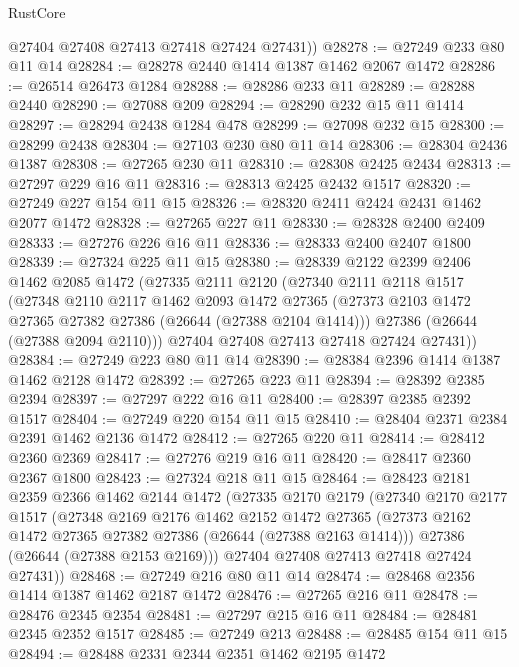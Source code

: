 \begin{lexlean}{RustCore}
\begin{coremodule}
        @27404
        @27408
        @27413
        @27418
        @27424
        @27431))
@28278 := @27249 @233 @80 @11 @14
@28284 := @28278 @2440 @1414 @1387 @1462 @2067 @1472
@28286 := @26514 @26473 @1284
@28288 := @28286 @233 @11
@28289 := @28288 @2440
@28290 := @27088 @209
@28294 := @28290 @232 @15 @11 @1414
@28297 := @28294 @2438 @1284 @478
@28299 := @27098 @232 @15
@28300 := @28299 @2438
@28304 := @27103 @230 @80 @11 @14
@28306 := @28304 @2436 @1387
@28308 := @27265 @230 @11
@28310 := @28308 @2425 @2434
@28313 := @27297 @229 @16 @11
@28316 := @28313 @2425 @2432 @1517
@28320 := @27249 @227 @154 @11 @15
@28326 := @28320 @2411 @2424 @2431 @1462 @2077 @1472
@28328 := @27265 @227 @11
@28330 := @28328 @2400 @2409
@28333 := @27276 @226 @16 @11
@28336 := @28333 @2400 @2407 @1800
@28339 := @27324 @225 @11 @15
@28380 := @28339
    @2122
    @2399
    @2406
    @1462
    @2085
    @1472
    (@27335
      @2111
      @2120
      (@27340
        @2111
        @2118
        @1517
        (@27348
          @2110
          @2117
          @1462
          @2093
          @1472
          @27365
          (@27373 @2103 @1472 @27365 @27382 @27386 (@26644 (@27388 @2104 @1414)))
          @27386
          (@26644 (@27388 @2094 @2110)))
        @27404
        @27408
        @27413
        @27418
        @27424
        @27431))
@28384 := @27249 @223 @80 @11 @14
@28390 := @28384 @2396 @1414 @1387 @1462 @2128 @1472
@28392 := @27265 @223 @11
@28394 := @28392 @2385 @2394
@28397 := @27297 @222 @16 @11
@28400 := @28397 @2385 @2392 @1517
@28404 := @27249 @220 @154 @11 @15
@28410 := @28404 @2371 @2384 @2391 @1462 @2136 @1472
@28412 := @27265 @220 @11
@28414 := @28412 @2360 @2369
@28417 := @27276 @219 @16 @11
@28420 := @28417 @2360 @2367 @1800
@28423 := @27324 @218 @11 @15
@28464 := @28423
    @2181
    @2359
    @2366
    @1462
    @2144
    @1472
    (@27335
      @2170
      @2179
      (@27340
        @2170
        @2177
        @1517
        (@27348
          @2169
          @2176
          @1462
          @2152
          @1472
          @27365
          (@27373 @2162 @1472 @27365 @27382 @27386 (@26644 (@27388 @2163 @1414)))
          @27386
          (@26644 (@27388 @2153 @2169)))
        @27404
        @27408
        @27413
        @27418
        @27424
        @27431))
@28468 := @27249 @216 @80 @11 @14
@28474 := @28468 @2356 @1414 @1387 @1462 @2187 @1472
@28476 := @27265 @216 @11
@28478 := @28476 @2345 @2354
@28481 := @27297 @215 @16 @11
@28484 := @28481 @2345 @2352 @1517
@28485 := @27249 @213
@28488 := @28485 @154 @11 @15
@28494 := @28488 @2331 @2344 @2351 @1462 @2195 @1472

\end{coremodule}
\end{lexlean}
